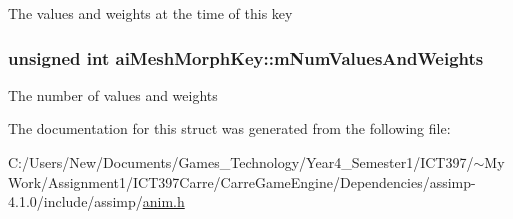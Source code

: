 The values and weights at the time of this key \hypertarget{structai_mesh_morph_key_28190ef15ed3535c9ae8dc1c8738a6ed}{
\subsubsection[mNumValuesAndWeights]{\setlength{\rightskip}{0pt plus 5cm}unsigned int {\bf aiMeshMorphKey::mNumValuesAndWeights}}}
\label{structai_mesh_morph_key_28190ef15ed3535c9ae8dc1c8738a6ed}


The number of values and weights 

The documentation for this struct was generated from the following file:\begin{CompactItemize}
\item 
C:/Users/New/Documents/Games\_\-Technology/Year4\_\-Semester1/ICT397/$\sim$My Work/Assignment1/ICT397Carre/CarreGameEngine/Dependencies/assimp-4.1.0/include/assimp/\hyperlink{anim_8h}{anim.h}\end{CompactItemize}
